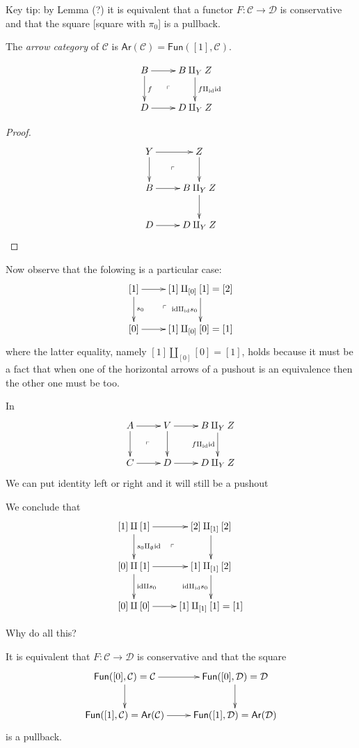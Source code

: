 Key tip: by Lemma (?) it is equivalent that
a functor $F: \mathcal{C} \to \mathcal{D}$ is conservative and
that the square [square with $\pi_0$] is a pullback.

\begin{definition}
\label{definition-arrow-category}
The {\it arrow category} of $\mathcal{C}$ is
$\mathsf{Ar}(\mathcal{C})=\mathsf{Fun}([1],\mathcal{C})$.
\end{definition}

\begin{lemma}
\label{lemma-1}
$$
\xymatrix{
B\ar[r]\ar[d]^f\ar@{}[dr]|-{\ulcorner}&B \amalg_YZ\ar[d]^
{f\amalg_{\text{id}}\text{id}}\\
D\ar[r]&D \amalg_YZ
}
$$
\end{lemma}

\begin{proof}
$$
\xymatrix{
Y\ar[r]\ar[d]\ar@{}[dr]|-{\ulcorner}&Z\ar[d]\\
B\ar[r]&B\amalg_YZ\ar[d]\\
D\ar[r]&D\amalg_YZ
}
$$
\end{proof}

Now observe that the folowing
is a particular case:
$$
\xymatrix{
[1]\ar[r]\ar[d]^{s_0}\ar@{}[dr]|-{\ulcorner}&[1]\amalg_{[0]}[1]=[2]\ar[d]
_{\text{id}\amalg_{\text{id}}s_0}\\
[0]\ar[r]&[1]\amalg_{[0]}[0]=[1]
}
$$
where the latter equality,
namely $[1]\amalg_{[0]}[0]=[1]$,
holds because it must be a fact that
when one of the horizontal arrows of a pushout 
is an equivalence then the other one must be too.

\begin{lemma}
\label{lemma-2}
In
$$
\xymatrix{
A\ar[r]\ar[d]\ar@{}[dr]|-{\ulcorner}&V\ar[d]
\ar[r]& B\amalg_YZ\ar[d]_{f\amalg_{\text{id}}\text{id}}\\
C\ar[r]&D\ar[r]&D\amalg_YZ
}
$$
We can put identity left or right and it will still be a pushout
\end{lemma}

We conclude that
$$
\xymatrix{
[1]\amalg [1]\ar[r]\ar[d]^{s_0 \amalg_{\emptyset}\text{id}}
\ar@{}[dr]|-{\ulcorner}&[2]\amalg_{[1]}[2]\ar[d]\\
[0]\amalg[1]\ar[d]^{\text{id}\amalg s_0}\ar[r]&[1]\amalg_{[1]}[2]
\ar[d]_{\text{id} \amalg_{\text{id}}s_0}\\
[0]\amalg[0]\ar[r]&[1]\amalg_{[1]}[1]=[1]
}
$$

Why do all this? 

\begin{proposition}
\label{proposition-characterization-conservative}
It is equivalent that $F:\mathcal{C} \to \mathcal{D}$
is conservative and that the square
$$
\xymatrix{
\mathsf{Fun}([0],\mathcal{C})=\mathcal{C}\ar[r]\ar[d]&
\mathsf{Fun}([0],\mathcal{D})=\mathcal{D}\ar[d]\\
\mathsf{Fun}([1],\mathcal{C})=\mathsf{Ar}(\mathcal{C})\ar[r]
&\mathsf{Fun}([1],\mathcal{D})=\mathsf{Ar}(\mathcal{D})
}
$$
is a pullback.
\end{proposition}

